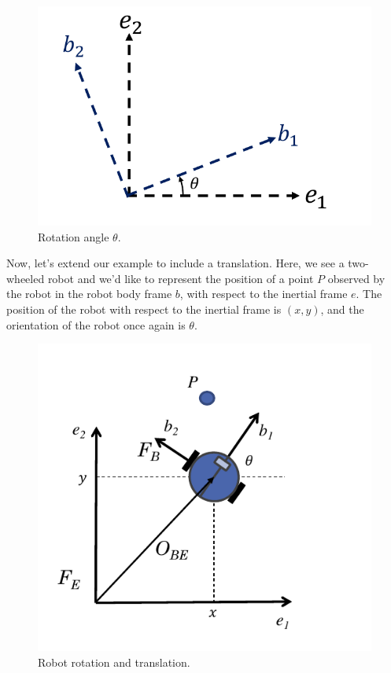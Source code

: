 \begin{figure}[!htb]
\begin{center}
\includegraphics[scale=0.290]{img/coordinate_transforms/theta_angle.jpeg}
\end{center}
\caption{Rotation angle $\theta$.}
\label{theta_angle}
\end{figure}


Now, let's extend our example to include a translation. Here, we see a two-wheeled robot and we'd like to represent the position of a point $P$ 
observed by the robot in the robot body frame $b$, with respect to the inertial frame $e$. 
The position of the robot with respect to the inertial frame is $(x, y)$, and the orientation of the robot once again is $\theta$.


\begin{figure}[!htb]
\begin{center}
\includegraphics[scale=0.290]{img/coordinate_transforms/robot_orientation.jpeg}
\end{center}
\caption{Robot rotation and translation.}
\label{robot_orientation}
\end{figure}

